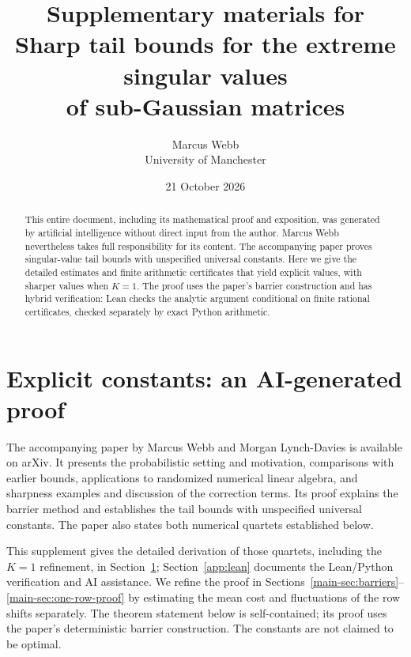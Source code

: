 \documentclass[11pt,a4paper]{article}
\title{Supplementary materials for\\
Sharp tail bounds for the extreme singular values\\
of sub-Gaussian matrices}
\author{Marcus Webb\\University of Manchester}
\date{21 October 2026}
\newcommand{\paperref}[1]{\ref{main-#1}}
\newcommand{\paperref}[1]{\ref*{main-#1}}
\numberwithin{equation}{section}
\begin{document}
\maketitle
\begin{abstract}
This entire document, including its mathematical proof and exposition,
was generated by artificial intelligence without direct input from the author.
Marcus Webb nevertheless takes full responsibility for its content.
The accompanying paper proves singular-value tail bounds with unspecified
universal constants. Here we give the detailed estimates and finite arithmetic
certificates that yield explicit values, with sharper values when $K=1$.
The proof uses the paper's barrier construction and has hybrid verification:
Lean checks the analytic argument
conditional on finite rational certificates, checked separately by exact
Python arithmetic.
\end{abstract}

\section{Explicit constants: an AI-generated proof}
\label{app:constants}

The accompanying paper by Marcus Webb and Morgan Lynch-Davies is available
on arXiv. It presents the probabilistic setting and motivation, comparisons with earlier bounds,
applications to randomized numerical linear algebra, and sharpness examples
and discussion of the correction terms. Its proof explains the barrier method
and establishes the tail bounds with unspecified universal constants.
The paper also states both numerical quartets established below.

This supplement gives the detailed derivation of those quartets, including
the $K=1$ refinement, in Section~\ref{app:constants}; Section~\ref{app:lean}
documents the Lean/Python verification and AI assistance.
We refine the proof in Sections~\paperref{sec:barriers}--\paperref{sec:one-row-proof}
by estimating the mean cost and fluctuations of the row shifts separately.
The theorem statement below is self-contained; its proof uses the paper's
deterministic barrier construction. The constants are not claimed to be optimal.
\end{document}
